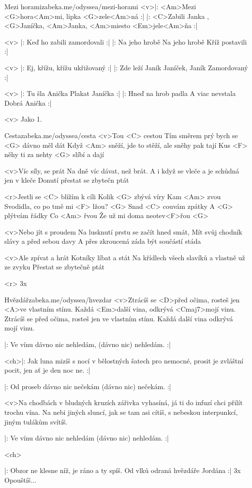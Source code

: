 \begin{song}[Čechomor]{58}{Mezi horami}{zabeka.me/odyssea/mezi-horami}
	<v>|: <Am>Mezi <G>hora<Am>mi, lipka <G>zele<Am>ná :|
	|: <C>Zabili Janka , <G>Janíčka, <Am>Janka, <Am>miesto <Em>jele<Am>ňa :|

	<v> |: Keď ho zabili
	zamordovali :|
	|: Na jeho hrobě
	Na jeho hrobě
	Kříž postavili :|

	<v> |: Ej, křížu, křížu
	ukřižovaný :|
	|: Zde leží Janík
	Janíček, Janík
	Zamordovaný :|

	<v> |: Tu šla Anička
	Plakat Janíčka :|
	|: Hneď na hrob padla
	A viac nevstala
	Dobrá Anička :|

	<v> Jako 1.
\end{song}
\begin{song}[Kryštof]{59}{Cesta}{zabeka.me/odyssea/cesta}
	<v>Tou <C> cestou
	Tím směrem prý bych se <G> dávno měl dát
	Když <Am> sněží, jde to stěží, ale sněhy pak tají
	Kus <F> něhy ti za nehty <G> slíbí a dají

	<v>Víc síly, se prát
	Na dně víc dávat, než brát.
	A i když se vleče a je schůdná jen v kleče
	Donutí přestat se zbytečn ptát

	<r>Jestli se <C> blížím k cíli
	Kolik <G> zbývá víry
	Kam <Am> zvou
	Svodidla, co po tmě mi <F> lžou? <G>
	Snad <C> couvám zpátky
	A <G> plýtvám řádky
	Co <Am> řvou
	Že už mi doma neotev<F>řou <G>

	<v>Nebo jít s proudem
	Na lusknutí prstu se začít hned smát,
	Mít svůj chodník slávy a před sebou davy
	A přes zkroucená záda být součástí stáda

	<v>Ale zpívat a hrát
	Kotníky líbat a stát
	Na křídlech všech slavíků a vlastně už ze zvyku
	Přestat se zbytečně ptát

	<r>
	3x
\end{song}
\begin{song}[UDG]{60}{Hvězdář}{zabeka.me/odyssea/hvezdar}
	<v>Ztrácíš se <D>před očima, rosteš jen <A>ve vlastním stínu.
	Každá <Em>další vina, odkrývá <Cmaj7>mojí vinu.
	Ztrácíš se před očima, rosteš jen ve vlastním stínu.
	Každá další vina odkrývá mojí vinu.

	|: Ve vínu dávno nic nehledám, (dávno nic) nehledám. :|

	<ch>|: Jak luna mizíš s nocí v bělostných šatech pro nemocné,
	prosit je zvláštní pocit, jen ať je den noc ne. :|

	|: Od proseb dávno nic nečekám (dávno nic) nečekám. :|

	<v>Na chodbách v bludných kruzích zářivka vyhasíná,
	já ti do infuzí chci přilít trochu vína.
	Na nebi jiných sluncí, jak se tam asi cítíš,
	s nebeskou interpunkcí, jiným tulákům svítíš.

	|: Ve vínu dávno nic nehledám (dávno nic) nehledám. :|

	<ch>

	|: Obzor ne klesne níž, je ráno a ty spíš.
	Od vlků odraná hvězdáře Jordána :| 3x
	Opouštíš...
\end{song}
